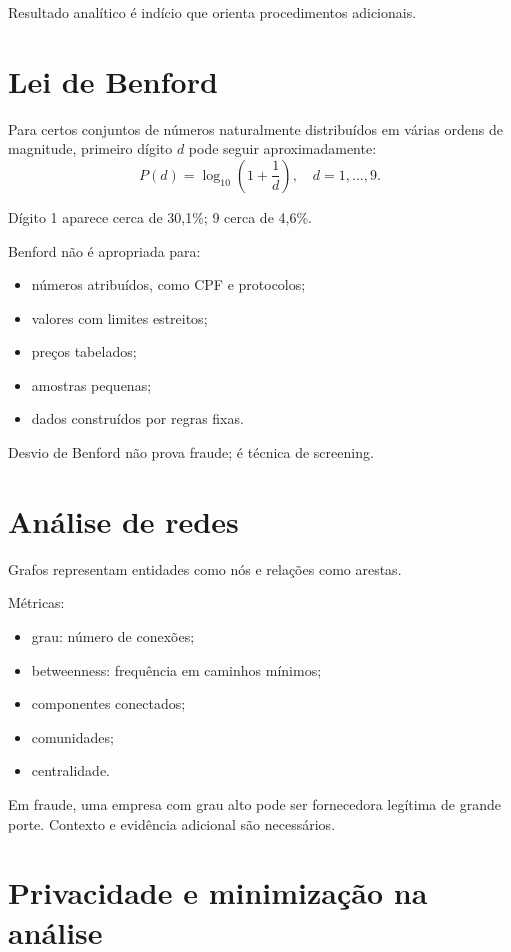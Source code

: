 Resultado analítico é indício que orienta procedimentos adicionais.

\section{Lei de Benford}

Para certos conjuntos de números naturalmente distribuídos em várias ordens de magnitude, primeiro dígito $d$ pode seguir aproximadamente:
\[
P(d)=\log_{10}\left(1+\frac{1}{d}\right),\quad d=1,\ldots,9.
\]

Dígito 1 aparece cerca de 30,1\%; 9 cerca de 4,6\%.

Benford não é apropriada para:
\begin{itemize}
\item números atribuídos, como CPF e protocolos;
\item valores com limites estreitos;
\item preços tabelados;
\item amostras pequenas;
\item dados construídos por regras fixas.
\end{itemize}

Desvio de Benford não prova fraude; é técnica de screening.

\section{Análise de redes}

Grafos representam entidades como nós e relações como arestas.

Métricas:
\begin{itemize}
\item grau: número de conexões;
\item betweenness: frequência em caminhos mínimos;
\item componentes conectados;
\item comunidades;
\item centralidade.
\end{itemize}

Em fraude, uma empresa com grau alto pode ser fornecedora legítima de grande porte. Contexto e evidência adicional são necessários.

\section{Privacidade e minimização na análise}

